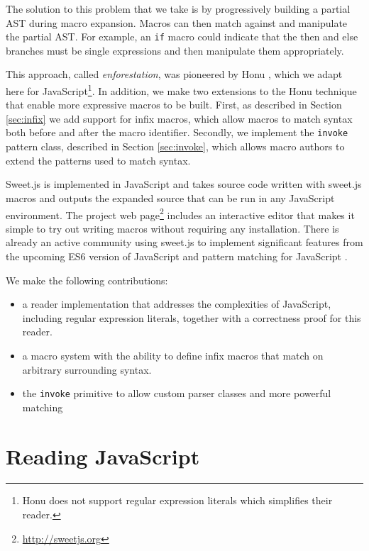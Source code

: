 \documentclass[preprint,10pt]{sigplanconf}
\begin{document}
The solution to this problem that we take is by progressively building
a partial AST during macro expansion. Macros can then match against
and manipulate the partial AST. For example, an \verb!if! macro
could indicate that the then and else branches must be single
expressions and then manipulate them appropriately.

This approach, called \emph{enforestation}, was pioneered by Honu
\cite{Rafkind2012,Rafkind2013}, which we adapt here for
JavaScript\footnote{Honu does not support regular expression literals
  which simplifies their reader. }. In addition, we make two
extensions to the Honu technique that enable more expressive macros to be built. First, as described in Section
\ref{sec:infix} we add support for infix macros, which allow macros to
match syntax both before and after the macro identifier. Secondly, we
implement the \verb!invoke! pattern class, described in Section
\ref{sec:invoke}, which allows macro authors to extend the patterns
used to match syntax.

Sweet.js is implemented in JavaScript and takes source code written with sweet.js macros and outputs the expanded source that can be run in any JavaScript environment. 
The project web page\footnote{\url{http://sweetjs.org}} includes an interactive editor that makes it simple to try out writing macros without requiring any installation.
There is already an active community using sweet.js to implement
significant features from the upcoming ES6 version of JavaScript \cite{Long} and pattern matching for JavaScript \cite{Faubion}.

We make the following contributions:

\begin{itemize}
\item a reader implementation that addresses the complexities of
  JavaScript, including regular expression literals, together with a
  correctness proof for this reader.
\item a macro system with the ability to define infix macros that
  match on arbitrary surrounding syntax.
\item the \texttt{invoke} primitive to allow custom parser classes and
  more powerful matching
\end{itemize}



\section{Reading JavaScript}
\label{sec:read}
\end{document}
